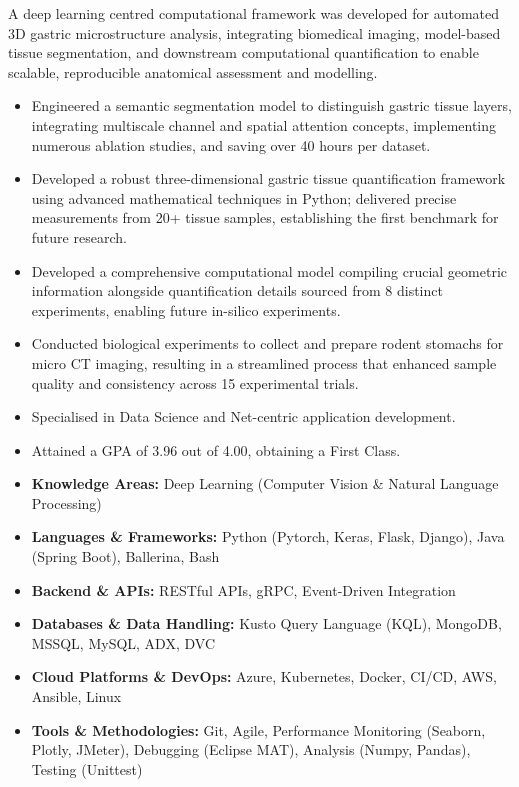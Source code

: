 \documentclass[12pt,a4paper,withhyper]{altacv}
\begin{document}
A deep learning centred computational framework was developed for automated 3D gastric microstructure analysis, integrating biomedical imaging, model-based tissue segmentation, and downstream computational quantification to enable scalable, reproducible anatomical assessment and modelling.
\begin{itemize}
    \item Engineered a semantic segmentation model to distinguish gastric tissue layers, integrating multiscale channel and spatial attention concepts, implementing numerous ablation studies, and saving over 40 hours per dataset.
    \item Developed a robust three-dimensional gastric tissue quantification framework using advanced mathematical techniques in Python; delivered precise measurements from 20+ tissue samples, establishing the first benchmark for future research.
    \item Developed a comprehensive computational model compiling crucial geometric information alongside quantification details sourced from 8 distinct experiments, enabling future in-silico experiments.
    \item Conducted biological experiments to collect and prepare rodent stomachs for micro CT imaging, resulting in a streamlined process that enhanced sample quality and consistency across 15 experimental trials.
\end{itemize}

\divider{}

\begin{itemize}
    \item Specialised in Data Science and Net-centric application development.
    \item Attained a GPA of 3.96 out of 4.00, obtaining a First Class.
\end{itemize}

\medskip

\begin{itemize}
    \item \textbf{Knowledge Areas:} Deep Learning (Computer Vision \& Natural Language Processing)
    \item \textbf{Languages \& Frameworks:} Python (Pytorch, Keras, Flask, Django), Java (Spring Boot), Ballerina, Bash
    \item \textbf{Backend \& APIs:} RESTful APIs, gRPC, Event-Driven Integration
    \item \textbf{Databases \& Data Handling:} Kusto Query Language (KQL), MongoDB, MSSQL, MySQL, ADX, DVC
    \item \textbf{Cloud Platforms \& DevOps:} Azure, Kubernetes, Docker, CI/CD, AWS, Ansible, Linux
    \item \textbf{Tools \& Methodologies:} Git, Agile, Performance Monitoring (Seaborn, Plotly, JMeter), Debugging (Eclipse MAT), Analysis (Numpy, Pandas), Testing (Unittest)
\end{itemize}
\end{document}
